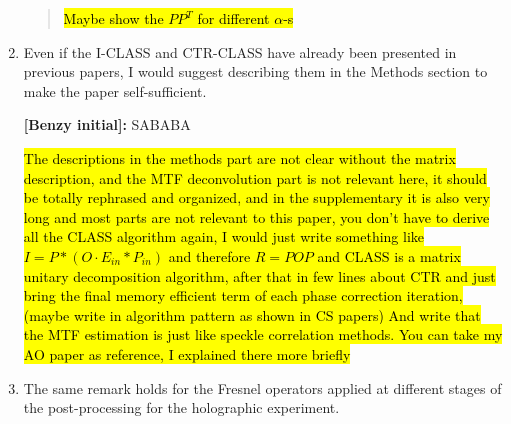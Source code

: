 \documentclass[12pt]{article}
\newcommand{\hlred}[1]{\sethlcolor{red!30}\hl{#1}}
\newenvironment{reviewercomment}
    {\begin{tcolorbox}[width=\linewidth,colback=gray!5,colframe=commentcolor!50,title=Reviewer Comment,left=5pt,right=5pt]}
    {\end{tcolorbox}}
\newenvironment{solved_reviewercomment}
    {\begin{tcolorbox}[width=\linewidth,colback=gray!5,colframe=solved_commentcolor!50,title=Reviewer Comment,left=5pt,right=5pt]}
    {\end{tcolorbox}}
\newenvironment{ourresponse}
    {\begin{tcolorbox}[width=\linewidth,breakable,enhanced,colback=gray!5,colframe=responsecolor!50,title=Response,left=5pt,right=5pt]}
    {\end{tcolorbox}}
\begin{document}
\begin{enumerate}[label=\arabic*.]
\begin{ourresponse}
\begin{quote}





\hlred{Maybe show the $PP^T$ for different $\alpha$-s}


\end{quote}
\end{ourresponse}
    
    \item \leavevmode\vspace{-\baselineskip}
    \begin{reviewercomment}
        Even if the I-CLASS and CTR-CLASS have already been presented in previous papers, I would suggest describing them in the Methods section to make the paper self-sufficient. 
    \end{reviewercomment}
    \begin{ourresponse}
        \textbf{[Benzy initial]:}
        SABABA
    \end{ourresponse}
    \hlred{The descriptions in the methods part are not clear without the matrix description, and the MTF deconvolution part is not relevant here, it should be totally rephrased and organized, and in the supplementary it is also very long and most parts are not relevant to this paper, you don't have to derive all the CLASS algorithm again, I would just write something like $I=P*(O\cdot E_{in}*P_{in})$ and therefore $R=POP$ and CLASS is a matrix unitary decomposition algorithm, after that in few lines about CTR and just bring the final memory efficient term of each phase correction iteration, (maybe write in algorithm pattern as shown in CS papers) 
    And write that the MTF estimation is just like speckle correlation methods. You can take my AO paper as reference, I explained there more briefly}
    \item \leavevmode\vspace{-\baselineskip}
    \begin{solved_reviewercomment}
        The same remark holds for the Fresnel operators applied at different stages of the post-processing for the holographic experiment.
    \end{solved_reviewercomment}


\end{enumerate}
\end{document}
